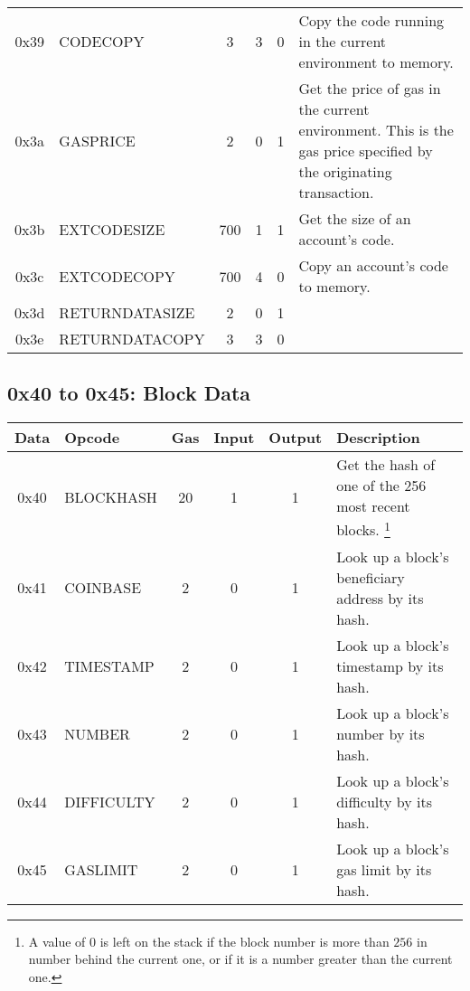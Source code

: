 \documentclass[10pt,a4paper,leqno,bibliography=totoc]{scrartcl}
\newenvironment{alphafootnotes}
{\par\edef\savedfootnotenumber{\number\value{footnote}}
\renewcommand{\thefootnote}{\alph{footnote}}
\setcounter{footnote}{0}}
{\par\setcounter{footnote}{\savedfootnotenumber}}
\begin{document}
\begin{alphafootnotes}
\begin{longtable}{|cP{2.8cm}cccp{6cm}|}
			0x39 & CODECOPY & 3 & 3 & 0 & Copy the code running in the current environment to memory. \\
			0x3a & GASPRICE & 2 & 0 & 1 & Get the price of gas in the current environment. This is the gas price specified by the originating transaction. \\
			0x3b & EXTCODESIZE & 700 & 1 & 1 & Get the size of an account's code. \\
			0x3c & EXTCODECOPY & 700 & 4 & 0 & Copy an account's code to memory. \\
			0x3d & RETURNDATASIZE & 2 & 0 & 1 & \\
			0x3e & RETURNDATACOPY & 3 & 3 & 0 & \\
			\hline
			\end{longtable}

	        \subsection{0x40 to 0x45: Block Data}
			\begin{longtable}{|cP{2.8cm}cccp{6cm}|}
			\hline
			\textbf{Data} & \textbf{Opcode} & \textbf{Gas}  & \textbf{Input}  & \textbf{Output} & \textbf{Description} \\
			\hline
			0x40 & BLOCKHASH & 20 & 1 & 1 & Get the hash of one of the 256 most recent blocks. \footnote{A value of 0 is left on the stack if the block number is more than $256$ in number behind the current one, or if it is a number greater than the current one.} \\ 
			0x41 & COINBASE & 2 & 0 & 1 & Look up a block's beneficiary address by its hash.\\
			0x42 & TIMESTAMP & 2 & 0 & 1 & Look up a block's timestamp by its hash.\\
			0x43 & NUMBER & 2  & 0 & 1 & Look up a block's number by its hash. \\
			0x44 & DIFFICULTY & 2 & 0 & 1 & Look up a block's difficulty by its hash. \\
			0x45 & GASLIMIT & 2  & 0 & 1 & Look up a block's gas limit by its hash. \\
			\hline
			\end{longtable}


\end{alphafootnotes}
\end{document}
